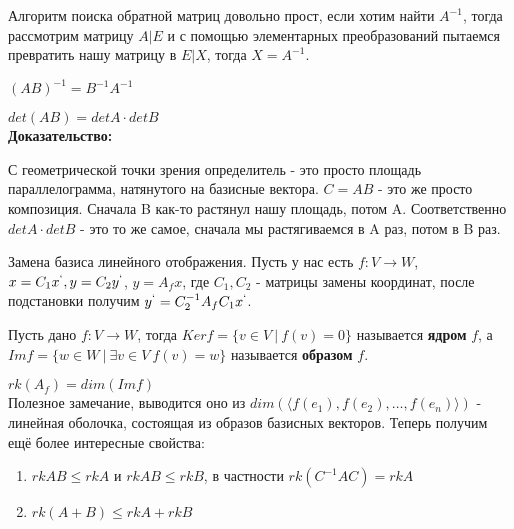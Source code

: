 \documentclass[12pt]{article}
\begin{document}
\begin{remarkbox}
    Алгоритм поиска обратной матриц довольно прост, если хотим найти $A^{-1}$, тогда рассмотрим матрицу $A|E$ и с помощью элементарных преобразований пытаемся превратить нашу матрицу в $E|X$, тогда $X = A^{-1}$.
\end{remarkbox}

\begin{remarkbox}
    $(AB)^{-1} = B^{-1}A^{-1}$
\end{remarkbox}

\begin{theorembox}
    $det(AB) = detA \cdot detB$\\

    \textbf{Доказательство:}

    С геометрической точки зрения определитель - это просто площадь параллелограмма, натянутого на базисные вектора. $C = AB$ - это же просто композиция. Сначала B как-то растянул нашу площадь, потом A. Соответственно $detA \cdot detB$ - это то же самое, сначала мы растягиваемся в A раз, потом в B раз.

\end{theorembox}

\begin{remarkbox}
    Замена базиса линейного отображения. Пусть у нас есть $f: V \rightarrow W$, $x = C_1x^`, y = C_2y^`$, $y = A_fx$, где $C_1, C_2$ - матрицы замены координат, после подстановки получим $y^` = C_2^{-1} A_f C_1 x^`$.
\end{remarkbox}

\begin{definitionbox}
    Пусть дано $f: V \rightarrow W$, тогда $Kerf = \{v \in V \ | \ f(v) = 0\}$ называется \textbf{ядром} $f$, а $Imf =  \{w \in W \ | \ \exists v \in V \ f(v) = w\}$ называется \textbf{образом} $f$.
\end{definitionbox}

\begin{remarkbox}
    $rk(A_f) = dim(Imf)$\\

    Полезное замечание, выводится оно из $dim(\langle f(e_1), f(e_2), \dots, f(e_n) \rangle)$ - линейная оболочка, состоящая из образов базисных векторов. Теперь получим ещё более интересные свойства:

    \begin{enumerate}
        \item $rkAB \leq rk A$ и $rkAB \leq rk B$, в частности $rk(C^{-1}AC) = rkA$
        \item $rk(A + B) \leq rkA + rkB$
    \end{enumerate}
\end{remarkbox}
\end{document}
